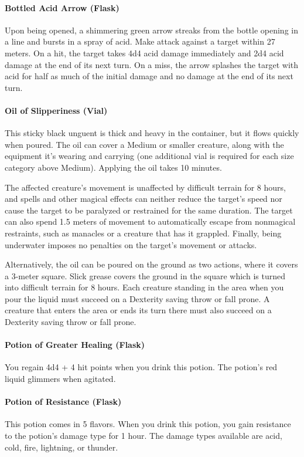 \paragraph{Bottled Acid Arrow (Flask)} %
    Upon being opened, a shimmering green arrow streaks from the bottle opening in a line and bursts in a spray of acid.
    Make attack against a target within 27 meters.
    On a hit, the target takes 4d4 acid damage immediately and 2d4 acid damage at the end of its next turn.
    On a miss, the arrow splashes the target with acid for half as much of the initial damage and no damage at the end of its next turn.
\paragraph{Oil of Slipperiness (Vial)} %
    This sticky black unguent is thick and heavy in the container, but it flows quickly when poured.
    The oil can cover a Medium or smaller creature, along with the equipment it's wearing and carrying (one additional vial is required for each size category above Medium).
    Applying the oil takes 10 minutes.

    The affected creature's movement is unaffected by difficult terrain for 8 hours, and spells and other magical effects can neither reduce the target's speed nor cause the target to be paralyzed or restrained for the same duration.
    The target can also spend 1.5 meters of movement to automatically escape from nonmagical restraints, such as manacles or a creature that has it grappled.
    Finally, being underwater imposes no penalties on the target's movement or attacks.

    Alternatively, the oil can be poured on the ground as two actions, where it covers a 3-meter square.
    Slick grease covers the ground in the square which is turned into difficult terrain for 8 hours.
    Each creature standing in the area when you pour the liquid must succeed on a Dexterity saving throw or fall prone.
    A creature that enters the area or ends its turn there must also succeed on a Dexterity saving throw or fall prone.
\paragraph{Potion of Greater Healing (Flask)}
    You regain 4d4 + 4 hit points when you drink this potion.
    The potion's red liquid glimmers when agitated.
\paragraph{Potion of Resistance (Flask)}
    This potion comes in 5 flavors.
    When you drink this potion, you gain resistance to the potion's damage type for 1 hour.
    The damage types available are acid, cold, fire, lightning, or thunder.
